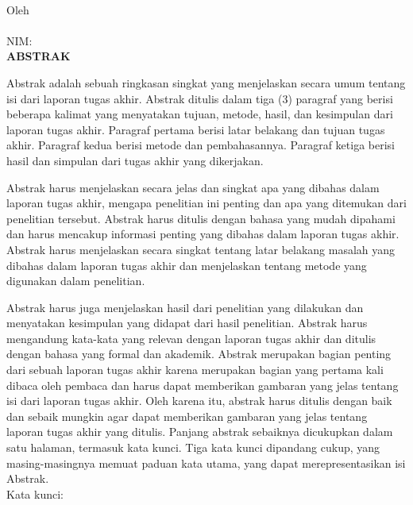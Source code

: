 
\clearpage
{}
{}
\begin{center}
    \textbf{\large{\judulid}}\\[0.5cm]
    Oleh\\
    \penulis\\
    NIM: \nim\\[2em]
    \textbf{ABSTRAK}\\[0.5cm]
\end{center}

Abstrak adalah sebuah ringkasan singkat yang menjelaskan secara umum tentang isi dari laporan tugas akhir. Abstrak ditulis dalam tiga (3) paragraf yang berisi beberapa kalimat yang menyatakan tujuan, metode, hasil, dan kesimpulan dari laporan tugas akhir. Paragraf pertama berisi latar belakang dan tujuan tugas akhir. Paragraf kedua berisi metode dan pembahasannya. Paragraf ketiga berisi hasil dan simpulan dari tugas akhir yang dikerjakan.

Abstrak harus menjelaskan secara jelas dan singkat apa yang dibahas dalam laporan tugas akhir, mengapa penelitian ini penting dan apa yang ditemukan dari penelitian tersebut. Abstrak harus ditulis dengan bahasa yang mudah dipahami dan harus mencakup informasi penting yang dibahas dalam laporan tugas akhir. Abstrak harus menjelaskan secara singkat tentang latar belakang masalah yang dibahas dalam laporan tugas akhir dan menjelaskan tentang metode yang digunakan dalam penelitian.

Abstrak harus juga menjelaskan hasil dari penelitian yang dilakukan dan menyatakan kesimpulan yang didapat dari hasil penelitian. Abstrak harus mengandung kata-kata yang relevan dengan laporan tugas akhir dan ditulis dengan bahasa yang formal dan akademik. Abstrak merupakan bagian penting dari sebuah laporan tugas akhir karena merupakan bagian yang pertama kali dibaca oleh pembaca dan harus dapat memberikan gambaran yang jelas tentang isi dari laporan tugas akhir. Oleh karena itu, abstrak harus ditulis dengan baik dan sebaik mungkin agar dapat memberikan gambaran yang jelas tentang laporan tugas akhir yang ditulis. Panjang abstrak sebaiknya dicukupkan dalam satu halaman, termasuk kata kunci. Tiga kata kunci dipandang cukup, yang masing-masingnya memuat paduan kata utama, yang dapat merepresentasikan isi Abstrak.\\[0.6cm]

\noindent Kata kunci: \katakunci
